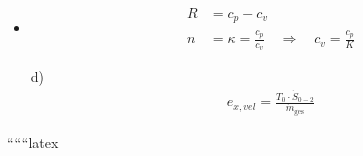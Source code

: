 \begin{itemize}
    \item 
    \begin{align*}
        R &= c_p - c_v \\
        n &= \kappa = \frac{c_p}{c_v} \quad \Rightarrow \quad c_v = \frac{c_p}{K}
    \end{align*}
\end{itemize}

\begin{itemize}
    \item[d)] 
    \begin{align*}
        e_{x, vel} = \frac{T_0 \cdot \dot{S}_{0-2}}{\dot{m}_{\text{ges}}}
    \end{align*}
\end{itemize}

``````latex


